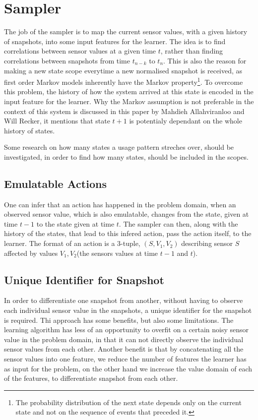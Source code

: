 \section{Sampler}\label{sec:sampler}
The job of the sampler is to map the current sensor values, with a given history of snapshots, into some input features for the learner.
The idea is to find correlations between sensor values at a given time $t$, rather than finding correlations between snapshots from time $t_{n-k}$ to $t_n$. This is also the reason for making a new state scope everytime a new normalised snapshot is received, as first order Markov models inherently have the Markov property\footnote{The probability distribution of the next state depends only on the current state and not on the sequence of events that preceded it.\cite{wiki_markov_chain}}. To overcome this problem, the history of how the system arrived at this state is encoded in the input feature for the learner. Why the Markov assumption is not preferable in the context of this system is discussed in this paper\cite{Allahviranloo201316} by Mahdieh Allahviranloo and Will Recker, it mentions that state $t+1$ is potentialy dependant on the whole history of states.

Some research on how many states a usage pattern streches over, should be investigated, in order to find how many states, should be included in the scopes.

\subsection{Emulatable Actions}
One can infer that an action has happened in the problem domain, when an observed sensor value, which is also emulatable, changes from the state, given at time $t-1$ to the state given at time $t$. The sampler can then, along with the history of the states, that lead to this infered action, pass the action itself, to the learner. The format of an action is a 3-tuple, $(S,V_1,V_2)$ describing sensor $S$ affected by values $V_1, V_2$(the sensors values at time $t-1$ and $t$).

\subsection{Unique Identifier for Snapshot}

In order to differentiate one snapshot from another, without having to observe each individual sensor value in the snapshots, a unique identifier for the snapshot is required.
Thi approach has some benefits, but also some limitations. The learning algorithm has less of an opportunity to overfit on a certain noisy sensor value in the problem domain, in that it can not directly observe the individual sensor values from each other.
Another benefit is that by concatenating all the sensor values into one feature, we reduce the number of features the learner has as input for the problem, on the other hand we increase the value domain of each of the features, to differentiate snapshot from each other.

